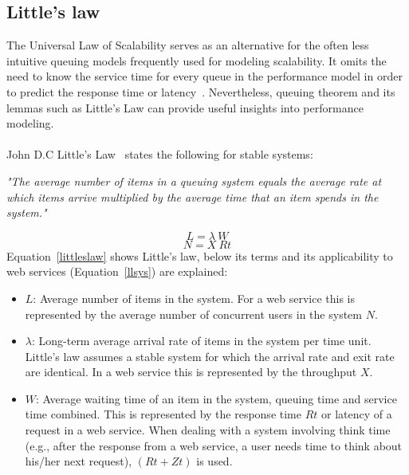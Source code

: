 \subsection{Little's law}
\label{sec:little}
The Universal Law of Scalability serves as an alternative for the often less intuitive queuing models frequently used for modeling scalability. It omits the need to know the service time for every queue in the performance model in order to predict the response time or latency~\cite{perfdynamics}. Nevertheless, queuing theorem and its lemmas such as Little's Law can provide useful insights into performance modeling.\\\\
John D.C Little's Law~\cite{little2008little} states the following for stable systems: 
\begin{displayquote}
\textit{"The average number of items in a queuing system equals the average rate at which items arrive multiplied by the average time that an item spends in the system.\cite{little2008little}"}
\end{displayquote}
\begin{equation}
\label{littleslaw}
L = \lambda~W
\end{equation}
\begin{equation}
\label{llsys}
N = X~Rt
\end{equation}
Equation~\ref{littleslaw} shows Little's law, below its terms and its applicability to web services (Equation~\ref{llsys}) are explained:
\begin{itemize}
    \item \textbf{$L$}:  Average number of items in the system. For a web service this is represented by the average number of concurrent users in the system $N$.
    \item \textbf{$\lambda$}: Long-term average arrival rate of items in the system per time unit. Little's law assumes a stable system for which the arrival rate and exit rate are identical. In a web service this is represented by the throughput $X$.
    \item \textbf{$W$}: Average waiting time of an item in the system, queuing time and service time combined. This is represented by the response time $Rt$ or latency of a request in a web service. When dealing with a system involving think time (e.g., after the response from a web service, a user needs time to think about his/her next request), $(Rt + Zt)$ is used. 
\end{itemize}


